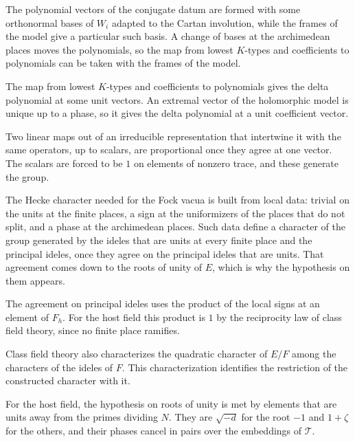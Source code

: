 The polynomial vectors of the conjugate datum are formed with some orthonormal bases of $W_i$ adapted to the
Cartan involution, while the frames of the model give a particular such basis. A change of bases at the
archimedean places moves the polynomials, so the map from lowest $K$-types and coefficients to polynomials
can be taken with the frames of the model.

The map from lowest $K$-types and coefficients to polynomials gives the delta polynomial at some unit
vectors. An extremal vector of the holomorphic model is unique up to a phase, so it gives the delta
polynomial at a unit coefficient vector.

Two linear maps out of an irreducible representation that intertwine it with the same operators, up to scalars,
are proportional once they agree at one vector. The scalars are forced to be $1$ on elements of nonzero trace, and
these generate the group.

The Hecke character needed for the Fock vacua is built from local data: trivial on the units at the finite places,
a sign at the uniformizers of the places that do not split, and a phase at the archimedean places. Such data define a
character of the group generated by the ideles that are units at every finite place and the principal ideles, once
they agree on the principal ideles that are units. That agreement comes down to the roots of unity of $E$, which is
why the hypothesis on them appears.

The agreement on principal ideles uses the product of the local signs at an element of $F_h$. For the host field this
product is $1$ by the reciprocity law of class field theory, since no finite place ramifies.

Class field theory also characterizes the quadratic character of $E/F$ among the characters of the ideles of $F$.
This characterization identifies the restriction of the constructed character with it.

For the host field, the hypothesis on roots of unity is met by elements that are units away from the primes dividing
$N$. They are $\sqrt{-d}$ for the root $-1$ and $1+\zeta$ for the others, and their phases cancel in pairs over the
embeddings of $\mathcal T$.

